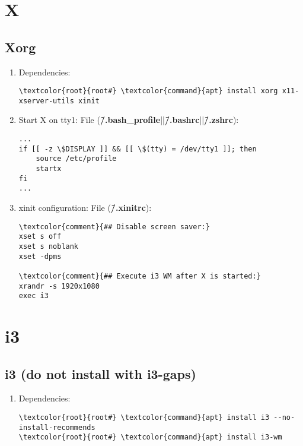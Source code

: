 \documentclass[10pt, a4paper, onecolumn, openany]{book} %
\begin{document}
\chapter{X}
\section{Xorg}
\begin{enumerate}
    \item Dependencies:
\begin{Verbatim}[commandchars=\\\{\}]
\textcolor{root}{root#} \textcolor{command}{apt} install xorg x11-xserver-utils xinit
\end{Verbatim}
    \item Start X on tty1:
\newline File (\textbf{\textcolor{file}{\~/.bash\_profile}}||\textbf{\textcolor{file}{\~/.bashrc}}||\textbf{\textcolor{file}{\~/.zshrc}}):
\begin{Verbatim}[commandchars=\\\{\}]
...
if [[ -z \$DISPLAY ]] && [[ \$(tty) = /dev/tty1 ]]; then
    source /etc/profile
    startx
fi
...
\end{Verbatim}
    \item xinit configuration:
\newline File (\textbf{\textcolor{file}{\~/.xinitrc}}):
\begin{Verbatim}[commandchars=\\\{\}]
\textcolor{comment}{## Disable screen saver:}
xset s off
xset s noblank
xset -dpms

\textcolor{comment}{## Execute i3 WM after X is started:}
xrandr -s 1920x1080
exec i3
\end{Verbatim}
\end{enumerate}
\chapter{i3}
\section{i3 (do not install with i3-gaps)}
\begin{enumerate}
    \item Dependencies:
\begin{Verbatim}[commandchars=\\\{\}]
\textcolor{root}{root#} \textcolor{command}{apt} install i3 --no-install-recommends
\textcolor{root}{root#} \textcolor{command}{apt} install i3-wm
\end{Verbatim}
\end{enumerate}
\end{document}
